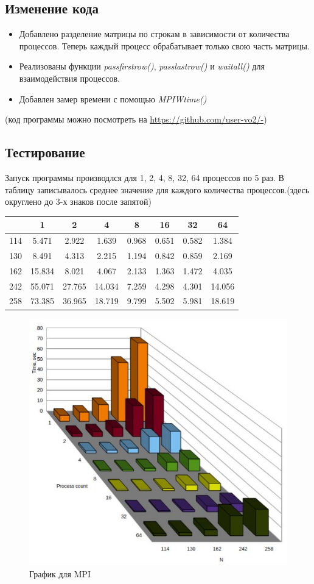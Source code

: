 \documentclass[a4paper,12pt,titlepage,final]{article}
\begin{document}
\subsection{Изменение кода}
\begin{itemize}
\item Добавлено разделение матрицы по строкам в зависимости от количества процессов. Теперь каждый процесс обрабатывает только свою часть матрицы.
\item Реализованы функции \textit{pass\textunderscore first\textunderscore row()}, \textit{pass\textunderscore last\textunderscore row()} и \textit{wait\textunderscore all()} для взаимодействия процессов.
\item Добавлен замер времени с помощью \textit{MPI\textunderscore Wtime()}
\end{itemize}
(код программы можно посмотреть на \url{https://github.com/user-vo2/-})
\subsection{Тестирование}
Запуск программы производлся для 1, 2, 4, 8, 32, 64 процессов по 5 раз. В таблицу записывалось среднее значение для каждого количества процессов.(здесь округлено до 3-х знаков после запятой)\par
\begin{tabular}{|c|c|c|c|c|c|c|c|}
\hline
	& 1 &	2 &	4 &	8 &	16 & 32 & 64\\
    \hline
114 &	5.471 & 2.922 & 1.639 &	0.968 &	0.651 &	0.582 &	1.384\\
    \hline
130 &	8.491 &	4.313 &	2.215 &	1.194 &	0.842 &	0.859 &	2.169\\
    \hline
162 &	15.834 &	8.021 &	4.067 &	2.133 &	1.363 &	1.472 &	4.035\\
    \hline
242 &	55.071 &	27.765 &	14.034 &	7.259 &	4.298 &	4.301 &	14.056\\
    \hline
258 &	73.385 &	36.965 &	18.719 &	9.799 &	5.502 &	5.981 &	18.619\\
    \hline
\end{tabular}
\par

\begin{figure}[h!]
  \includegraphics[width=0.6\linewidth]{mpi_graph.jpeg}
  \caption{График для MPI}
  \label{fig:mpi_graph}
\end{figure}
\newpage
\end{document}
